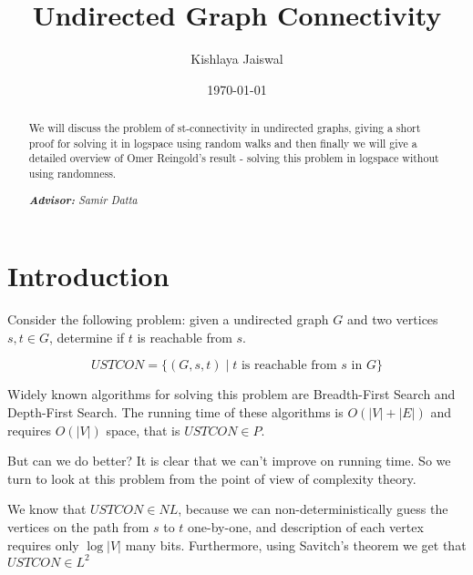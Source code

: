 \documentclass[10pt]{article}
\title{Undirected Graph Connectivity}
\author{Kishlaya Jaiswal\\%
    }
\date{\today}
\theoremstyle{plain}
\theoremstyle{definition}
\begin{document}
{
\maketitle
\begin{abstract}

We will discuss the problem of st-connectivity in undirected graphs, giving a short proof for solving it in logspace using random walks and then finally we will give a detailed overview of Omer Reingold's result - solving this problem in logspace without using randomness.

\noindent
\textit{\textbf{Advisor: }%
Samir Datta} \\ %

\end{abstract}
}



\section{Introduction}

Consider the following problem: given a undirected graph $G$ and two vertices $s,t \in G$, determine if $t$ is reachable from $s$.

$$USTCON = \{(G,s,t) \mid t \text{ is reachable from } s \text{ in } G\}$$

Widely known algorithms for solving this problem are Breadth-First Search and Depth-First Search. The running time of these algorithms is $O(|V|+|E|)$ and requires $O(|V|)$ space, that is $USTCON \in P$.

But can we do better? It is clear that we can't improve on running time. So we turn to look at this problem from the point of view of complexity theory.

We know that $USTCON \in NL$, because we can non-deterministically guess the vertices on the path from $s$ to $t$ one-by-one, and description of each vertex requires only $\log |V|$ many bits. Furthermore, using Savitch's theorem we get that $USTCON \in L^2$
\end{document}
